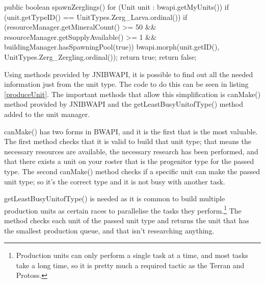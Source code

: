 \documentclass[11pt,openright,a4paper]{report}
\begin{document}
\begin{Code}[frame=single,language=Java,breaklines,breakatwhitespace,caption={The original method used to produce a Zergling\protect\footnote{Zerglings are the basic unit of a Zerg player's army. They are small, fast, and have a melee attack}},label=spawnZergling]
public boolean spawnZerglings(){
    for (Unit unit : bwapi.getMyUnits()) {
        if (unit.getTypeID() == UnitTypes.Zerg_Larva.ordinal()) {
            if (resourceManager.getMineralCount() >= 50 && resourceManager.getSupplyAvailable() >= 1 && buildingManager.hasSpawningPool(true))
            {
                bwapi.morph(unit.getID(), UnitTypes.Zerg_Zergling.ordinal());
                return true;
            }
        }
    }
    return false;
}
\end{Code}

Using methods provided by JNIBWAPI, it is possible to find out all the needed information just from the unit type. The code to do this can be seen in listing \ref{produceUnit}. The important methods that allow this simplification is canMake() method provided by JNIBWAPI and the getLeastBusyUnitofType() method added to the unit manager. 

canMake() has two forms in BWAPI, and it is the first that is the most valuable. The first method checks that it is valid to build that unit type; that means the necessary resources are available, the necessary research has been performed, and that there exists a unit on your roster that is the progenitor type for the passed type. The second canMake() method checks if a specific unit can make the passed unit type; so it's the correct type and it is not busy with another task.

getLeastBusyUnitofType() is needed as it is common to build multiple production units as certain races to parallelise the tasks they perform.\footnote{Production units can only perform a single task at a time, and most tasks take a long time, so it is pretty much a required tactic as the Terran and Protoss.} The method checks each unit of the passed unit type and returns the unit that has the smallest production queue, and that isn't researching anything.
\end{document}
